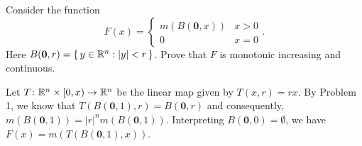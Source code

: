 \begin{problem}
  Consider the function
  \[
    F(x)=
    \begin{cases}
      m(B(\mathbf{0},x))&x>0\\
      0&x=0
    \end{cases}.
  \]
  Here $B(\mathbf{0},r)=\left\{\, y \in\mathbb{R}^n:| y |<r\,\right\}$. Prove
  that $F$ is monotonic increasing and continuous.
\end{problem}



\begin{solution}
  Let $T\colon\mathbb{R}^n\times[0,x)\to\mathbb{R}^n$ be the linear map given by
  $T(x,r)=rx$. By Problem 1, we know that
  $T(B(\mathbf{0},1),r)=B(\mathbf{0},r)$ and consequently,
  $m(B(\mathbf{0},1))=|r|^nm(B(\mathbf{0},1))$. Interpreting
  $B(\mathbf{0},0)=\emptyset$, we have
  $F(x)=m\left(T(B(\mathbf{0},1),x)\right)$.
\end{solution}

